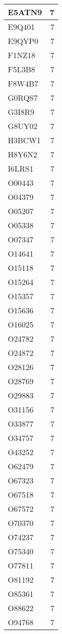 \documentclass[
]{book}
\theoremstyle{definition}
\theoremstyle{definition}
\theoremstyle{definition}
\theoremstyle{definition}
\theoremstyle{remark}
\begin{document}
\begin{table}
\begin{tabular}{l|r}
\hline
E5ATN9 & 7\\
\hline
E9Q401 & 7\\
\hline
E9QYP0 & 7\\
\hline
F1NZ18 & 7\\
\hline
F5L3B8 & 7\\
\hline
F8W4B7 & 7\\
\hline
G0RQS7 & 7\\
\hline
G3I8R9 & 7\\
\hline
G8UY02 & 7\\
\hline
H3BCW1 & 7\\
\hline
H8Y6N2 & 7\\
\hline
I6LRS1 & 7\\
\hline
O00443 & 7\\
\hline
O04379 & 7\\
\hline
O05207 & 7\\
\hline
O05338 & 7\\
\hline
O07347 & 7\\
\hline
O14641 & 7\\
\hline
O15118 & 7\\
\hline
O15264 & 7\\
\hline
O15357 & 7\\
\hline
O15636 & 7\\
\hline
O16025 & 7\\
\hline
O24782 & 7\\
\hline
O24872 & 7\\
\hline
O28126 & 7\\
\hline
O28769 & 7\\
\hline
O29883 & 7\\
\hline
O31156 & 7\\
\hline
O33877 & 7\\
\hline
O34757 & 7\\
\hline
O43252 & 7\\
\hline
O62479 & 7\\
\hline
O67323 & 7\\
\hline
O67518 & 7\\
\hline
O67572 & 7\\
\hline
O70370 & 7\\
\hline
O74237 & 7\\
\hline
O75340 & 7\\
\hline
O77811 & 7\\
\hline
O81192 & 7\\
\hline
O85361 & 7\\
\hline
O88622 & 7\\
\hline
O94768 & 7\\

\end{tabular}
\end{table}
\end{document}
